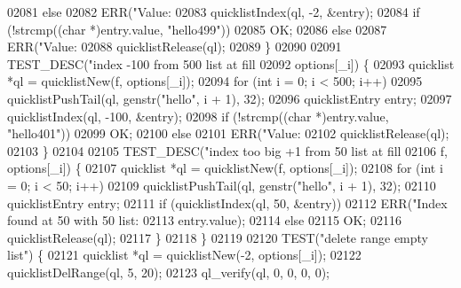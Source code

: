 \begin{DoxyCode}
{{{{{{{{{{{{{{{{{{{{{{{{{{{{{{{{{{{{{{{{{{{{{{{{{{{{{{{{{{{{{{{{02081                 \textcolor{keywordflow}{else}
02082                     ERR(\textcolor{stringliteral}{"Value: %
02083                 quicklistIndex(ql, -2, &entry);
02084                 \textcolor{keywordflow}{if} (!strcmp((\textcolor{keywordtype}{char} *)entry.value, \textcolor{stringliteral}{"hello499"}))
02085                     OK;
02086                 \textcolor{keywordflow}{else}
02087                     ERR(\textcolor{stringliteral}{"Value: %
02088                 quicklistRelease(ql);
02089             \}
02090 
02091             TEST\_DESC(\textcolor{stringliteral}{"index -100 from 500 list at fill %
02092                       options[\_i]) \{
02093                 quicklist *ql = quicklistNew(f, options[\_i]);
02094                 \textcolor{keywordflow}{for} (\textcolor{keywordtype}{int} i = 0; i < 500; i++)
02095                     quicklistPushTail(ql, genstr(\textcolor{stringliteral}{"hello"}, i + 1), 32);
02096                 quicklistEntry entry;
02097                 quicklistIndex(ql, -100, &entry);
02098                 \textcolor{keywordflow}{if} (!strcmp((\textcolor{keywordtype}{char} *)entry.value, \textcolor{stringliteral}{"hello401"}))
02099                     OK;
02100                 \textcolor{keywordflow}{else}
02101                     ERR(\textcolor{stringliteral}{"Value: %
02102                 quicklistRelease(ql);
02103             \}
02104 
02105             TEST\_DESC(\textcolor{stringliteral}{"index too big +1 from 50 list at fill %
02106                       f, options[\_i]) \{
02107                 quicklist *ql = quicklistNew(f, options[\_i]);
02108                 \textcolor{keywordflow}{for} (\textcolor{keywordtype}{int} i = 0; i < 50; i++)
02109                     quicklistPushTail(ql, genstr(\textcolor{stringliteral}{"hello"}, i + 1), 32);
02110                 quicklistEntry entry;
02111                 \textcolor{keywordflow}{if} (quicklistIndex(ql, 50, &entry))
02112                     ERR(\textcolor{stringliteral}{"Index found at 50 with 50 list: %
02113                         entry.value);
02114                 \textcolor{keywordflow}{else}
02115                     OK;
02116                 quicklistRelease(ql);
02117             \}
02118         \}
02119 
02120         TEST(\textcolor{stringliteral}{"delete range empty list"}) \{
02121             quicklist *ql = quicklistNew(-2, options[\_i]);
02122             quicklistDelRange(ql, 5, 20);
02123             ql\_verify(ql, 0, 0, 0, 0);
}}}}}}}}}}}}}}}}}}}}}}}}}}}}}}}}}}}}}}}}}}}}}}}}}}}}}}}}}}}}}}}}}}}}}}
\end{DoxyCode}
